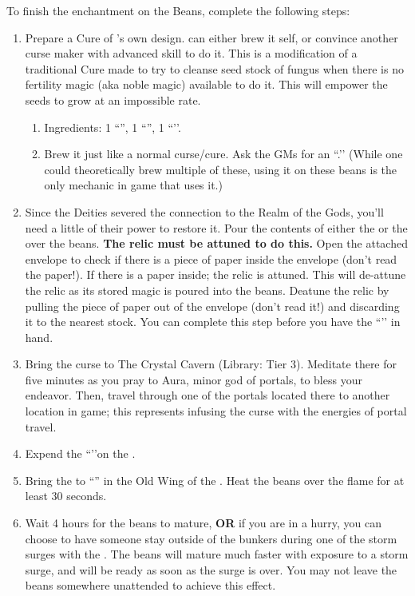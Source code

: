 \documentclass[green]{GL2020}
\begin{document}
To finish the enchantment on the Beans, complete the following steps:
\begin{enumerate}
  \item Prepare a Cure of \cCurse{}’s own design. \cCurse{} can either brew it \cCurse{\them}self, or convince another curse maker with advanced skill to do it. This is a modification of a traditional Cure made to try to cleanse seed stock of fungus when there is no fertility magic (aka noble magic) available to do it. This will empower the seeds to grow at an impossible rate.
  \begin{enumerate}
    \item Ingredients: 1 ``\iHollyhock{}'', 1 ``\iBlackCrocus{}'', 1 ``\iClay{}’’.
    \item Brew it just like a normal curse/cure. Ask the GMs for an ``\iEyeOfVulture{}.’’ (While one could theoretically brew multiple of these, using it on these beans is the only mechanic in game that uses it.)
  \end{enumerate}
  \item Since the Deities severed the connection to the Realm of the Gods, you’ll need a little of their power to restore it. Pour the contents of either the \iPitcher{} or the \iChalice{} over the beans. \textbf{The relic must be attuned to do this.} Open the attached envelope to check if there is a piece of paper inside the envelope (don’t read the paper!). If there is a paper inside; the relic is attuned. This will de-attune the relic as its stored magic is poured into the beans. Deatune the relic by pulling the piece of paper out of the envelope (don’t read it!) and discarding it to the nearest stock. You can complete this step before you have the ``\iEyeOfVulture{}’’ in hand.
  \item Bring the curse to The Crystal Cavern (Library: Tier 3). Meditate there for five minutes as you pray to Aura, minor god of portals, to bless your endeavor. Then, travel through one of the portals located there to another location in game; this represents infusing the curse with the energies of portal travel. 
  \item Expend the ``\iEyeOfVulture{}’’on the \iBeansNB{}.  \item Bring the \iBeansNB{} to ``\sPFlameOne{}'' in the Old Wing of the \pSc{}. Heat the beans over the flame for at least 30 seconds.
  \item Wait 4 hours for the beans to mature, \textbf{OR} if you are in a hurry, you can choose to have someone stay outside of the bunkers during one of the storm surges with the \iBeansNB{}. The beans will mature much faster with exposure to a storm surge, and will be ready as soon as the surge is over. You may not leave the beans somewhere unattended to achieve this effect.

\end{enumerate}
\end{document}
